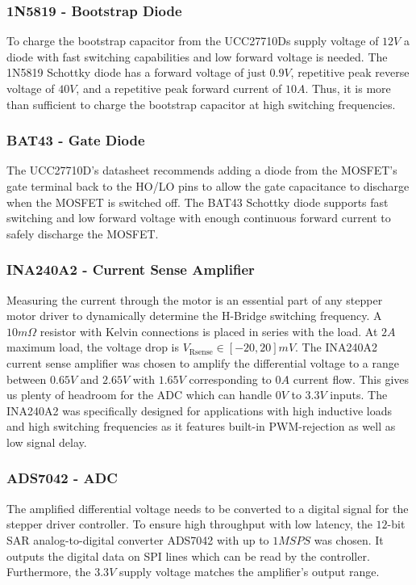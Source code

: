 \subsubsection{1N5819 - Bootstrap Diode}
To charge the bootstrap capacitor from the UCC27710Ds supply voltage of $12V$ a diode with fast switching capabilities and low forward voltage is needed.
The 1N5819 Schottky diode has a forward voltage of just $0.9V$, repetitive peak reverse voltage of $40V$, and a repetitive peak forward current of $10A$.
Thus, it is more than sufficient to charge the bootstrap capacitor at high switching frequencies.

\subsubsection{BAT43 - Gate Diode}
The UCC27710D's datasheet recommends adding a diode from the MOSFET's gate terminal back to the HO/LO pins to allow the gate capacitance to discharge when the MOSFET is switched off.
The BAT43 Schottky diode supports fast switching and low forward voltage with enough continuous forward current to safely discharge the MOSFET.

\subsubsection{INA240A2 - Current Sense Amplifier}
Measuring the current through the motor is an essential part of any stepper motor driver to dynamically determine the H-Bridge switching frequency.
A $10m\Omega$ resistor with Kelvin connections is placed in series with the load.
At $2A$ maximum load, the voltage drop is $V_{\text{Rsense}} \in [-20, 20]mV$.
The INA240A2 current sense amplifier was chosen to amplify the differential voltage to a range between $0.65V$ and $2.65V$ with $1.65V$ corresponding to $0A$ current flow.
This gives us plenty of headroom for the ADC which can handle $0V$ to $3.3V$ inputs.
The INA240A2 was specifically designed for applications with high inductive loads and high switching frequencies as it features built-in PWM-rejection as well as low signal delay.

\subsubsection{ADS7042 - ADC}
The amplified differential voltage needs to be converted to a digital signal for the stepper driver controller.
To ensure high throughput with low latency, the $12$-bit SAR analog-to-digital converter ADS7042 with up to $1MSPS$ was chosen.
It outputs the digital data on SPI lines which can be read by the controller.
Furthermore, the $3.3V$ supply voltage matches the amplifier's output range.

